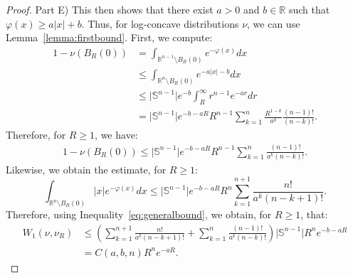 \documentclass[10pt,a4paper]{amsart}
\begin{document}
\begin{proof}
Part E) This then shows that there exist $a>0$ and $b \in \mathbb{R}$ such that $\varphi(x) \geq a\left\vert x \right\vert + b$. Thus, for log-concave distributions $\nu$, we can use Lemma~\ref{lemma:firstbound}. First, we compute:
\begin{align}\label{eq:mbn1}
1 - \nu(B_{R}(0)) &= \int_{\mathbb{R}^{n-1} \setminus B_{R}(0)} e^{-\varphi(x)}dx \\
&\leq \int_{\mathbb{R}^{n} \setminus B_{R}(0)} e^{-a \vert x \vert - b}dx \\
&\leq \vert \mathbb{S}^{n-1} \vert e^{-b} \int_{R}^{\infty} r^{n-1}e^{-a r}dr \\
&= \vert \mathbb{S}^{n-1} \vert e^{-b-aR} R^{n-1} \sum_{k=1}^{n} \frac{R^{1-k}}{a^k} \frac{(n-1)!}{(n-k)!}.
\end{align}
Therefore, for $R \geq 1$, we have:
\begin{align}
1 - \nu(B_{R}(0)) \leq \vert \mathbb{S}^{n-1} \vert e^{-b-aR} R^{n-1} \sum_{k=1}^{n} \frac{(n-1)!}{a^k(n-k)!}.
\end{align}
Likewise, we obtain the estimate, for $R \geq 1$:
\begin{equation}\label{eq:mbn2}
\int_{\mathbb{R}^n \setminus B_{R}(0)} \vert x \vert e^{-\varphi(x)}dx \leq \vert \mathbb{S}^{n-1} \vert e^{-b - aR} R^n \sum_{k=1}^{n+1} \frac{n!}{a^k (n - k+1)!}.
\end{equation}
Therefore, using Inequality~\eqref{eq:generalbound}, we obtain, for $R \geq 1$, that:
\begin{align}\label{eq:fastrate}
W_1(\nu, \nu_R) &\leq \left( \sum_{k=1}^{n+1} \frac{n!}{a^k(n - k + 1)!} + \sum_{k=1}^{n} \frac{(n-1)!}{a^k(n - k)!} \right) \vert \mathbb{S}^{n-1} \vert R^n e^{-b - aR} \\
&= C(a, b, n) R^n e^{-aR}.
\end{align}
\end{proof}
\end{document}
